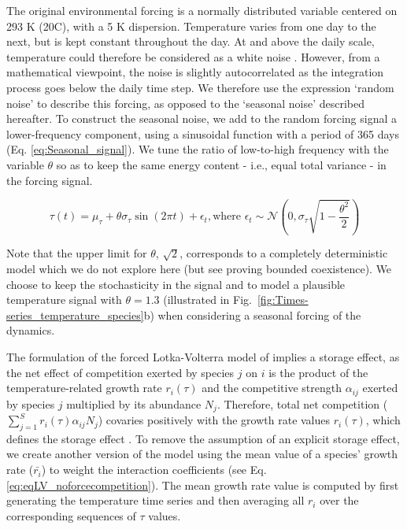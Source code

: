 \documentclass[a4paper,12pt]{article}
\begin{document}
The original environmental forcing is a normally distributed variable
centered on 293 K (20\textdegree C), with a 5 K dispersion. Temperature varies
from one day to the next, but is kept constant throughout the day.
At and above the daily scale, temperature could therefore be considered
as a white noise \citep{vasseur_color_2004}. However, from a mathematical
viewpoint, the noise is slightly autocorrelated as the integration
process goes below the daily time step. We therefore use the expression
`random noise' to describe this forcing, as opposed to the `seasonal
noise' described hereafter. To construct the seasonal noise, we add
to the random forcing signal a lower-frequency component, using a
sinusoidal function with a period of 365 days (Eq. \ref{eq:Seasonal_signal}).
We tune the ratio of low-to-high frequency with the variable $\theta$
so as to keep the same energy content - i.e., equal total variance
- in the forcing signal.

\begin{equation}
\tau(t)=\mu_{\tau}+\theta\sigma_{\tau}\sin\left(2\pi t\right)+\epsilon_{t},\text{where }\epsilon_{t}\sim\mathcal{N}\left(0,\sigma_{\tau}\sqrt{1-\frac{\theta^{2}}{2}}\right)\label{eq:Seasonal_signal}
\end{equation}

Note that the upper limit for $\theta$, $\sqrt{2}$, corresponds
to a completely deterministic model which we do not explore here (but
see \citet{zhao1991qualitative} proving bounded coexistence). We
choose to keep the stochasticity in the signal and to model a plausible
temperature signal with $\theta=1.3$ (illustrated in Fig.~\ref{fig:Times-series_temperature_species}b)
when considering a seasonal forcing of the dynamics.

The formulation of the forced Lotka-Volterra model of \citet{scranton_coexistence_2016}
implies a storage effect, as the net effect of competition exerted
by species $j$ on $i$ is the product of the temperature-related
growth rate $r_{i}(\tau)$ and the competitive strength $\alpha_{ij}$
exerted by species $j$ multiplied by its abundance $N_{j}$. Therefore,
total net competition ($\sum_{j=1}^{S}r_{i}(\tau)\alpha_{ij}N_{j}$)
covaries positively with the growth rate values $r_{i}(\tau)$, which
defines the storage effect \citep{chesson_multispecies_1994,fox_intermediate_2013,ellner_how_2016}.
To remove the assumption of an explicit storage effect, we create
another version of the model using the mean value of a species' growth
rate ($\bar{r_{i}}$) to weight the interaction coefficients (see
Eq. \ref{eq:eqLV_noforcecompetition}). The mean growth rate value
is computed by first generating the temperature time series and then
averaging all $r_{i}$ over the corresponding sequences of $\tau$
values.
\end{document}
